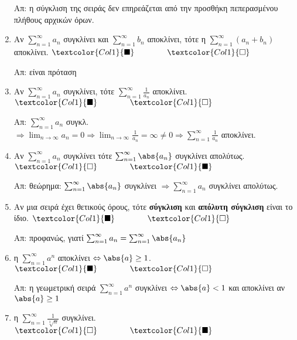 \begin{enumerate}[itemsep=.5\baselineskip]
    Απ: η σύγκλιση της σειράς δεν επηρεάζεται από την προσθήκη πεπερασμένου πλήθους
    αρχικών όρων.

  \item \textcolor{Col1}{Αν $ \sum_{n=1}^{\infty} a_{n}$ συγκλίνει και $
    \sum_{n=1}^{\infty} b_{n} $ αποκλίνει, τότε η 
  $ \sum_{n=1}^{\infty}(a_{n}+b_{n}) $ αποκλίνει}.
    \hfill $\textcolor{Col1}{\blacksquare} \qquad \qquad \textcolor{Col1}{\square}$

    Απ: είναι πρόταση 

  \item \textcolor{Col1}{Αν $ \sum_{n=1}^{\infty} a_{n}$ συγκλίνει, τότε 
    $ \sum_{n=1}^{\infty} \frac{1}{a_{n}} $ αποκλίνει.}
    \hfill $\textcolor{Col1}{\blacksquare} \qquad \qquad \textcolor{Col1}{\square}$

    Απ: $ \sum_{n=1}^{\infty} a_{n} $ συγκλ. $ \Rightarrow \lim_{n \to \infty} a_{n} = 0
    \Rightarrow \lim_{n \to \infty} \frac{1}{a_{n}} = \infty \neq 0 \Rightarrow
    \sum_{n=1}^{\infty} \frac{1}{a_{n}} $ αποκλίνει.

  \item \textcolor{Col1}{Αν $ \sum_{n=1}^{\infty} a_{n} $ συγκλίνει τότε $
    \sum_{n=1}^{\infty} \abs{a_{n}} $ συγκλίνει απολύτως}.
    \hfill $\textcolor{Col1}{\square} \qquad \qquad \textcolor{Col1}{\blacksquare}$

    Απ: θεώρημα: $ \sum_{n=1}^{\infty} \abs{a_{n}} $ συγκλίνει $ \Rightarrow
    \sum_{n=1}^{\infty} a_{n} $ συγκλίνει απολύτως.

  \item \textcolor{Col1}{Αν μια σειρά έχει θετικούς όρους, τότε \textbf{σύγκλιση} 
    και \textbf{απόλυτη σύγκλιση} είναι το ίδιο.}
    \hfill $\textcolor{Col1}{\blacksquare} \qquad \qquad \textcolor{Col1}{\square}$

    Απ: προφανώς, γιατί $ \sum_{n=1}^{\infty} a_{n} = \sum_{n=1}^{\infty} \abs{a_{n}} $ 

  \item \textcolor{Col1}{η $ \sum_{n=1}^{\infty} a^{n} $ αποκλίνει $ \Leftrightarrow
    \abs{a} \geq 1 $}.
    \hfill $\textcolor{Col1}{\blacksquare} \qquad \qquad \textcolor{Col1}{\square}$

    Απ: η γεωμετρική σειρά $ \sum_{n=1}^{\infty} a^{n} $ συγκλίνει 
    $ \Leftrightarrow \abs{a} < 1 $ και αποκλίνει αν $ \abs{a} \geq 1 $

  \item \textcolor{Col1}{η $ \sum_{n=1}^{\infty} \frac{1}{\sqrt[3]{n}} $ συγκλίνει}.
    \hfill $\textcolor{Col1}{\square} \qquad \qquad \textcolor{Col1}{\blacksquare}$


\end{enumerate}
